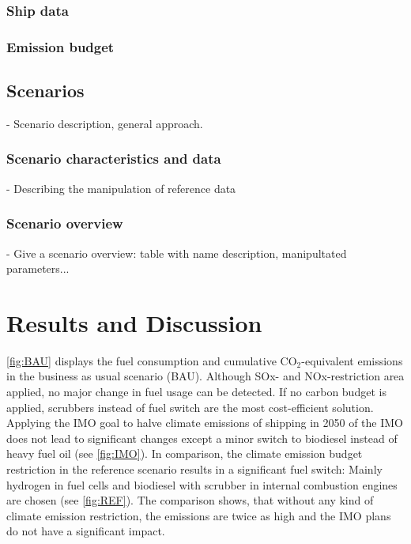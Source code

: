 \documentclass[article]{elsarticle}
\begin{document}
\subsubsection{Ship data}

\subsubsection{Emission budget}

\subsection{Scenarios}
\label{subsec:Sce}
- Scenario description, general approach.
\subsubsection{Scenario characteristics and data}
- Describing the manipulation of reference data
\subsubsection{Scenario overview}
- Give a scenario overview: table with name description, manipultated parameters...

\section{Results and Discussion}
\label{sec:Results}


\autoref{fig:BAU} displays the fuel consumption and cumulative CO$_2$-equivalent emissions in the business as usual scenario (BAU). Although SOx- and NOx-restriction area applied, no major change in fuel usage can be detected. If no carbon budget is applied, scrubbers instead of fuel switch are the most cost-efficient solution. Applying the IMO goal to halve climate emissions of shipping in 2050 of the IMO does not lead to significant changes except a minor switch to biodiesel instead of heavy fuel oil (see \autoref{fig:IMO}). In comparison, the climate emission budget restriction in the reference scenario  results in a significant fuel switch: Mainly hydrogen in fuel cells and biodiesel with scrubber in internal combustion engines are chosen (see \autoref{fig:REF}). The comparison shows, that without any kind of climate emission restriction, the emissions are twice as high and the IMO plans do not have a significant impact. 
\end{document}
